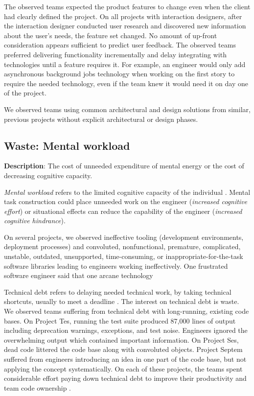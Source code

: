 The observed teams expected the product features to change even when the client had clearly defined the project. On all projects with interaction designers, after the interaction designer conducted user research and discovered new information about the user's needs, the feature set changed. No amount of up-front consideration appears sufficient to predict user feedback. The observed teams preferred delivering functionality incrementally and delay integrating with technologies until a feature requires it. For example, an engineer would only add asynchronous background jobs technology when working on the first story to require the needed technology, even if the team knew it would need it on day one of the project.

We observed teams using common architectural and design solutions from similar, previous projects without explicit architectural or design phases.
\subsection{Waste: Mental workload}
\textbf{Description}: The cost of unneeded expenditure of mental energy or the cost of decreasing cognitive capacity.

\textit{Mental workload} refers to the limited cognitive capacity of the individual \cite{Longo2014Dissertation}. Mental task construction could place unneeded work on the engineer (\textit{increased cognitive effort}) or situational effects can reduce the capability of the engineer (\textit{increased cognitive hindrance}).

On several projects, we observed ineffective tooling (development environments, deployment processes) and convoluted, nonfunctional, premature, complicated, unstable, outdated, unsupported, time-consuming, or inappropriate-for-the-task software libraries leading to engineers working ineffectively. One frustrated software engineer said that one arcane technology 

Technical debt refers to delaying needed technical work, by taking technical shortcuts, usually to meet a deadline \cite{McConnellTechnicalDebt}. The interest on technical debt is waste. We observed teams suffering from technical debt with long-running, existing code bases. On Project Tes, running the test suite produced 87,000 lines of output including deprecation warnings, exceptions, and test noise. Engineers ignored the overwhelming output which contained important information.  On Project Ses, dead code littered the code base along with convoluted objects. Project Septem suffered from engineers introducing an idea in one part of the code base, but not applying the concept systematically. On each of these projects, the teams spent considerable effort paying down technical debt to improve their productivity and team code ownership \cite{SedanoTeamCodeOwnership}.  

